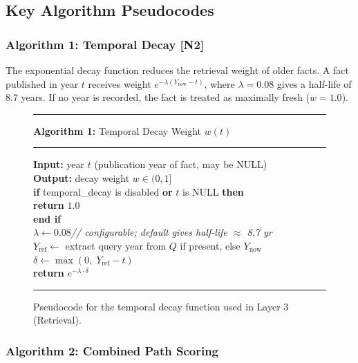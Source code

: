 \subsection{Key Algorithm Pseudocodes}

\subsubsection{Algorithm 1: Temporal Decay [N2]}

The exponential decay function reduces the retrieval weight of older facts. A fact published in year $t$ receives weight $e^{-\lambda(Y_{\text{now}}-t)}$, where $\lambda=0.08$ gives a half-life of 8.7 years. If no year is recorded, the fact is treated as maximally fresh ($w=1.0$).

\begin{figure}[H]
\centering
\begin{minipage}{0.82\textwidth}
\hrule\vspace{4pt}
\textbf{Algorithm 1:} Temporal Decay Weight $w(t)$
\vspace{4pt}\hrule\vspace{6pt}
\textbf{Input:} year $t$ (publication year of fact, may be NULL)\\
\textbf{Output:} decay weight $w \in (0,1]$\\[4pt]
\textbf{if} temporal\_decay is disabled \textbf{or} $t$ is NULL \textbf{then}\\
\hspace*{1.2em}\textbf{return} $1.0$\\
\textbf{end if}\\
$\lambda \leftarrow 0.08$\hfill\textit{// configurable; default gives half-life $\approx$ 8.7 yr}\\
$Y_{\text{ref}} \leftarrow$ extract query year from $Q$ if present, else $Y_{\text{now}}$\\
$\delta \leftarrow \max(0,\; Y_{\text{ref}} - t)$\\
\textbf{return} $e^{-\lambda \cdot \delta}$
\vspace{6pt}\hrule
\end{minipage}
\caption{Pseudocode for the temporal decay function used in Layer 3 (Retrieval).}
\label{alg:decay}
\end{figure}

\subsubsection{Algorithm 2: Combined Path Scoring}

